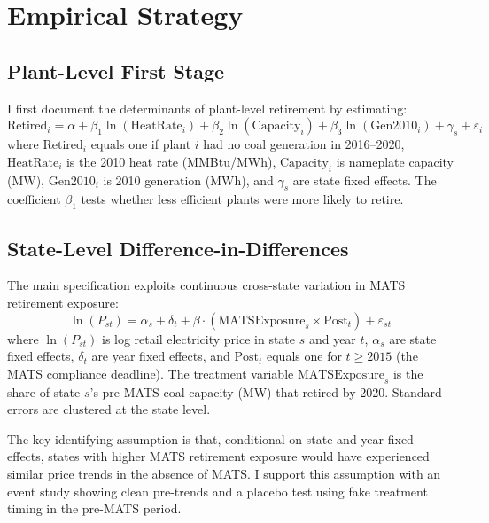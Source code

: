 \documentclass[12pt]{article}
\begin{document}
\section{Empirical Strategy}

\subsection{Plant-Level First Stage}

I first document the determinants of plant-level retirement by estimating:
\begin{equation}
\text{Retired}_i = \alpha + \beta_1 \ln(\text{HeatRate}_i) + \beta_2 \ln(\text{Capacity}_i) + \beta_3 \ln(\text{Gen2010}_i) + \gamma_s + \varepsilon_i
\end{equation}
where $\text{Retired}_i$ equals one if plant $i$ had no coal generation in 2016--2020, $\text{HeatRate}_i$ is the 2010 heat rate (MMBtu/MWh), $\text{Capacity}_i$ is nameplate capacity (MW), $\text{Gen2010}_i$ is 2010 generation (MWh), and $\gamma_s$ are state fixed effects. The coefficient $\beta_1$ tests whether less efficient plants were more likely to retire.

\subsection{State-Level Difference-in-Differences}

The main specification exploits continuous cross-state variation in MATS retirement exposure:
\begin{equation}
\ln(P_{st}) = \alpha_s + \delta_t + \beta \cdot (\text{MATSExposure}_s \times \text{Post}_t) + \varepsilon_{st}
\end{equation}
where $\ln(P_{st})$ is log retail electricity price in state $s$ and year $t$, $\alpha_s$ are state fixed effects, $\delta_t$ are year fixed effects, and $\text{Post}_t$ equals one for $t \geq 2015$ (the MATS compliance deadline). The treatment variable $\text{MATSExposure}_s$ is the share of state $s$'s pre-MATS coal capacity (MW) that retired by 2020. Standard errors are clustered at the state level.

The key identifying assumption is that, conditional on state and year fixed effects, states with higher MATS retirement exposure would have experienced similar price trends in the absence of MATS. I support this assumption with an event study showing clean pre-trends and a placebo test using fake treatment timing in the pre-MATS period.
\end{document}
